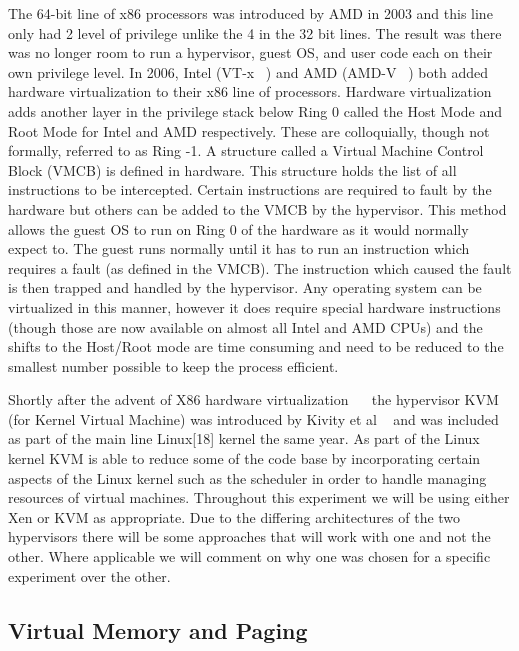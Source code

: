 The 64-bit line of x86 processors was introduced by AMD in 2003 and this line only had 2 level of privilege unlike the 4 in the 32 bit lines. The result was there was no longer room to run a hypervisor, guest OS, and user code each on their own privilege level. In 2006, Intel (VT-x ~\cite{neiger_intel_2006}) and AMD (AMD-V ~\cite{codenamed_pacifica_2005}) both added hardware virtualization to their x86 line of processors. Hardware virtualization adds another layer in the privilege stack below Ring 0 called the Host Mode and Root Mode for Intel and AMD respectively. These are colloquially, though not formally, referred to as Ring -1. A structure called a Virtual Machine Control Block (VMCB) is defined in hardware. This structure holds the list of all instructions to be intercepted. Certain instructions are required to fault by the hardware but others can be added to the VMCB by the hypervisor. This method allows the guest OS to run on Ring 0 of the hardware as it would normally expect to. The guest runs normally until it has to run an instruction which requires a fault (as defined in the VMCB). The instruction which caused the fault is then trapped and handled by the hypervisor. Any operating system can be virtualized in this manner, however it does require special hardware instructions (though those are now available on almost all Intel and AMD CPUs) and the shifts to the Host/Root mode are time consuming and need to be reduced to the smallest number possible to keep the process efficient.


Shortly after the advent of X86 hardware virtualization ~\cite{neiger_intel_2006}~\cite{codenamed_pacifica_2005} the hypervisor KVM (for Kernel Virtual Machine) was introduced by Kivity et al ~\cite{kivity_kvm:_2007} and was included as part of the main line Linux[18] kernel the same year. As part of the Linux kernel KVM is able to reduce some of the code base by incorporating certain aspects of the Linux kernel such as the scheduler in order to handle managing resources of virtual machines.  Throughout this experiment we will be using either Xen or KVM as appropriate. Due to the differing architectures of the two hypervisors there will be some approaches that will work with one and not the other. Where applicable we will comment on why one was chosen for a specific experiment over the other.

\subsection{Virtual Memory and Paging}

